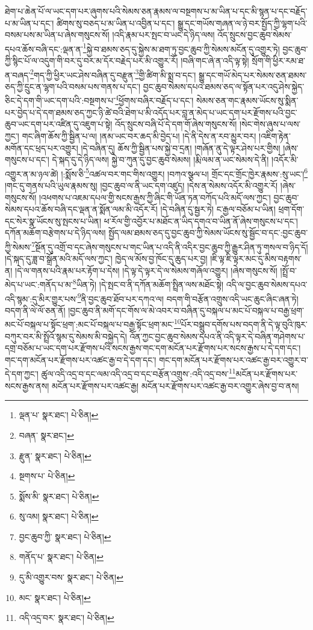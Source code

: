 ཐེག་པ་ཆེན་པོ་ལ་ཡང་དག་པར་ཞུགས་པའི་སེམས་ཅན་རྣམས་ལ་བསྔགས་པ་མ་ཡིན་པ་དང་མི་སྙན་པ་དང་བརྗོད་པ་མ་ཡིན་པ་དང་། ཚིགས་སུ་བཅད་པ་མ་ཡིན་པ་འབྱིན་པ་དང་། སྒྱུ་དང་གཡོས་གཞན་ལ་ཉེ་བར་སྤྱོད་ཀྱི་ལྷག་པའི་བསམ་པས་མ་ཡིན་པ་ཞེས་གསུངས་སོ། །འདི་རྣམ་པར་སྤང་བ་ཡང་དེ་ཉིད་ལས། འོད་སྲུངས་བྱང་ཆུབ་སེམས་དཔའ་ཆོས་བཞི་དང་:ལྡན་ན་\footnote{ལྡན་པ་  སྣར་ཐང་།  པེ་ཅིན། }སྐྱེ་བ་ཐམས་ཅད་དུ་སྐྱེས་མ་ཐག་ཏུ་བྱང་ཆུབ་ཀྱི་སེམས་མངོན་དུ་འགྱུར་ཏེ། བྱང་ཆུབ་ཀྱི་སྙིང་པོ་ལ་འདུག་གི་བར་དུ་བར་མ་དོར་བརྗེད་པར་མི་འགྱུར་རོ། །བཞི་གང་ཞེ་ན་འདི་ལྟ་སྟེ། སྲོག་གི་ཕྱིར་རམ་ཐ་ན་བཞད་\footnote{བཞན་  སྣར་ཐང་། }གད་ཀྱི་ཕྱིར་ཡང་ཤེས་བཞིན་དུ་བརྫུན་\footnote{རྫུན་  སྣར་ཐང་།  པེ་ཅིན། }གྱི་ཚིག་མི་སྨྲ་བ་དང་། སྒྱུ་དང་གཡོ་མེད་པར་སེམས་ཅན་ཐམས་ཅད་ཀྱི་དྲུང་ན་ལྷག་པའི་བསམ་པས་གནས་པ་དང་། བྱང་ཆུབ་སེམས་དཔའ་ཐམས་ཅད་ལ་སྟོན་པར་འདུ་ཤེས་སྐྱེད་ཅིང་དེ་དག་གི་ཡང་དག་པའི་:བསྔགས་པ་\footnote{སྔགས་པ་  པེ་ཅིན། }ཕྱོགས་བཞིར་བརྗོད་པ་དང་། སེམས་ཅན་གང་རྣམས་ཡོངས་སུ་སྨིན་པར་བྱེད་པ་དེ་དག་ཐམས་ཅད་ཀྱང་ཉི་ཚེ་བའི་ཐེག་པ་མི་འདོད་པར་བླ་ན་མེད་པ་ཡང་དག་པར་རྫོགས་པའི་བྱང་ཆུབ་ཡང་དག་པར་འཛིན་དུ་འཇུག་པ་སྟེ། འོད་སྲུངས་བཞི་པོ་དེ་དག་གོ་ཞེས་གསུངས་སོ། །སེང་གེས་ཞུས་པ་ལས་ཀྱང་། གང་ཞིག་ཆོས་ཀྱི་སྦྱིན་པ་ལ། །ནམ་ཡང་བར་ཆད་མི་བྱེད་པ། །དེ་ནི་དེས་ན་རབ་མྱུར་བར། །འཇིག་རྟེན་མགོན་དང་ཕྲད་པར་འགྱུར། །དེ་བཞིན་དུ། ཆོས་ཀྱི་སྦྱིན་པས་སྐྱེ་བ་དྲན། །གཞོན་ནུ་དེ་ལྟར་ཤེས་པར་གྱིས། །ཞེས་གསུངས་པ་དང་། དེ་སྐད་དུ་དེ་ཉིད་ལས། སྐྱེ་བ་ཀུན་དུ་བྱང་ཆུབ་སེམས། །རྨི་ལམ་ན་ཡང་སེམས་དེ་ནི། །འདོར་མི་འགྱུར་ན་མ་ཉལ་ཚེ། །:སྨོས་ཅི་\footnote{སྨོས་མི་  སྣར་ཐང་།  པེ་ཅིན། }འཚལ་བར་གང་གིས་འགྱུར། །བཀའ་སྩལ་པ། གྲོང་དང་གྲོང་ཁྱེར་རྣམས་:སུ་ཡང་།\footnote{སུ་འམ།  སྣར་ཐང་།  པེ་ཅིན། } །གང་དུ་གནས་པའི་ཡུལ་རྣམས་སུ། །བྱང་ཆུབ་ལ་ནི་ཡང་དག་འཛུད། །དེས་ན་སེམས་འདོར་མི་འགྱུར་རོ། །ཞེས་གསུངས་སོ། །འཕགས་པ་འཇམ་དཔལ་གྱི་སངས་རྒྱས་ཀྱི་ཞིང་གི་ཡོན་ཏན་བཀོད་པའི་མདོ་ལས་ཀྱང་། བྱང་ཆུབ་སེམས་དཔའ་ཆོས་བཞི་དང་ལྡན་ན་སྨོན་ལམ་མི་འདོར་རོ། །དེ་བཞིན་དུ་སྦྱར་ཏེ། ང་རྒྱལ་བཅོམ་པ་ཡིན། ཕྲག་དོག་དང་སེར་སྣ་ཡོངས་སུ་སྤངས་པ་ཡིན། ཕ་རོལ་གྱི་འབྱོར་པ་མཐོང་ན་ཡིད་དགའ་བ་ཡིན་ནོ་ཞེས་གསུངས་པ་དང་། དཀོན་མཆོག་བརྩེགས་པ་དེ་ཉིད་ལས། སྤྱོད་ལམ་ཐམས་ཅད་དུ་བྱང་ཆུབ་ཀྱི་སེམས་ཡོངས་སུ་སྦྱོང་བ་དང་:བྱང་ཆུབ་ཀྱི་སེམས་\footnote{བྱང་ཆུབ་ཀྱི་  སྣར་ཐང་།  པེ་ཅིན། }སྔོན་དུ་འགྲོ་བ་དང་ཞེས་གསུངས་པ་གང་ཡིན་པ་འདི་ནི་འདིར་བྱང་ཆུབ་ཀྱི་རྒྱུར་ཤིན་ཏུ་གསལ་བ་ཉིད་དོ། །དེ་སྐད་དུ་ཟླ་བ་སྒྲོན་མའི་མདོ་ལས་ཀྱང་། ཁྱེད་ལ་མོས་བྱ་ཁོང་དུ་ཆུད་པར་བྱ། །ཇི་ལྟ་ཇི་ལྟར་མང་དུ་མིས་བརྟགས་ན། །དེ་ལ་གནས་པའི་རྣམ་པར་རྟོག་པ་དེས། །དེ་ལྟ་དེ་ལྟར་དེ་ལ་སེམས་གཞོལ་འགྱུར། །ཞེས་གསུངས་སོ། །སྤྲོ་བ་མེད་པ་ཡང་:གནོད་པ་མ་\footnote{གནོད་པ་  སྣར་ཐང་།  པེ་ཅིན། }ཡིན་ཏེ། །དེ་སྤང་བ་ནི་དཀོན་མཆོག་སྤྲིན་ལས་མཐོང་སྟེ། འདི་ལ་བྱང་ཆུབ་སེམས་དཔའ་འདི་སྙམ་:དུ་མིར་གྱུར་པས་\footnote{དུ་མི་འགྱུར་བས་  སྣར་ཐང་།  པེ་ཅིན། }ནི་བྱང་ཆུབ་ཐོབ་པར་དཀའ་ལ། བདག་གི་བརྩོན་འགྲུས་འདི་ཡང་ཆུང་ཞིང་ཞན་ཏེ། བདག་ནི་ལེ་ལོ་ཅན་ནོ། །བྱང་ཆུབ་ནི་མགོ་དང་གོས་ལ་མེ་འབར་བ་བཞིན་དུ་བསྐལ་པ་མང་པོ་བསྐལ་པ་བརྒྱ་ཕྲག་མང་པོ་བསྐལ་པ་སྟོང་ཕྲག་:མང་པོ་བསྐལ་པ་བརྒྱ་སྟོང་ཕྲག་མང་\footnote{མང་  སྣར་ཐང་།  པེ་ཅིན། }པོར་བསྒྲུབ་དགོས་པས་བདག་ནི་དེ་ལྟ་བུའི་ཁུར་བཀུར་བར་མི་སྤྲོའོ་སྙམ་དུ་སེམས་མི་བསྐྱེད་དེ། འོན་ཀྱང་བྱང་ཆུབ་སེམས་དཔའ་ནི་འདི་ལྟར་དེ་བཞིན་གཤེགས་པ་དགྲ་བཅོམ་པ་ཡང་དག་པར་རྫོགས་པའི་སངས་རྒྱས་གང་དག་མངོན་པར་རྫོགས་པར་སངས་རྒྱས་པ་དེ་དག་དང་། གང་དག་མངོན་པར་རྫོགས་པར་འཚང་རྒྱ་བ་དེ་དག་དང་། གང་དག་མངོན་པར་རྫོགས་པར་འཚང་རྒྱ་བར་འགྱུར་བ་དེ་དག་ཀྱང་། ཚུལ་འདི་འདྲ་བ་དང་ལམ་འདི་འདྲ་བ་དང་བརྩོན་འགྲུས་:འདི་འདྲ་བས་\footnote{འདི་འདྲ་བར་  སྣར་ཐང་།  པེ་ཅིན། }མངོན་པར་རྫོགས་པར་སངས་རྒྱས་ནས། མངོན་པར་རྫོགས་པར་འཚང་རྒྱ། མངོན་པར་རྫོགས་པར་འཚང་རྒྱ་བར་འགྱུར་ཞེས་བྱ་བ་ནས། 